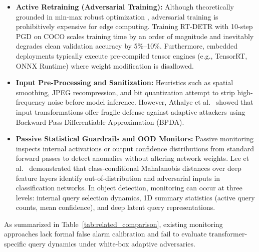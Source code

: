 \documentclass[preprint,12pt]{elsarticle}
\begin{document}
\begin{itemize}
    \item \textbf{Active Retraining (Adversarial Training):} Although theoretically grounded in min-max robust optimization \citep{madry2017towards, zhang2019theoretically}, adversarial training is prohibitively expensive for edge computing. Training RT-DETR with 10-step PGD on COCO scales training time by an order of magnitude and inevitably degrades clean validation accuracy by 5\%--10\%. Furthermore, embedded deployments typically execute pre-compiled tensor engines (e.g., TensorRT, ONNX Runtime) where weight modification is disallowed.
    \item \textbf{Input Pre-Processing and Sanitization:} Heuristics such as spatial smoothing, JPEG recompression, and bit quantization \citep{dziugaite2016study} attempt to strip high-frequency noise before model inference. However, Athalye et al.~\cite{athalye2018obfuscated} showed that input transformations offer fragile defense against adaptive attackers using Backward Pass Differentiable Approximation (BPDA).
    \item \textbf{Passive Statistical Guardrails and OOD Monitors:} Passive monitoring inspects internal activations or output confidence distributions from standard forward passes to detect anomalies without altering network weights. Lee et al.~\cite{lee2018simple} demonstrated that class-conditional Mahalanobis distances over deep feature layers identify out-of-distribution and adversarial inputs in classification networks. In object detection, monitoring can occur at three levels: internal query selection dynamics, 1D summary statistics (active query counts, mean confidence), and deep latent query representations.
\end{itemize}

As summarized in Table~\ref{tab:related_comparison}, existing monitoring approaches lack formal false alarm calibration and fail to evaluate transformer-specific query dynamics under white-box adaptive adversaries.
\end{document}
